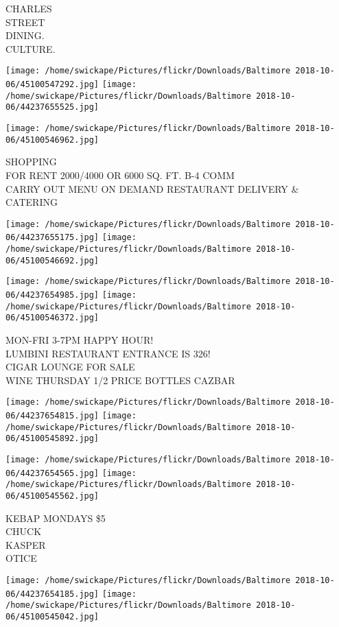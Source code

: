 \documentclass[10pt,letterpaper]{article}
\begin{document}
CHARLES\\
STREET\\
DINING.\\
CULTURE.
\pagebreak

\texttt{[image: /home/swickape/Pictures/flickr/Downloads/Baltimore 2018-10-06/45100547292.jpg]}
\texttt{[image: /home/swickape/Pictures/flickr/Downloads/Baltimore 2018-10-06/44237655525.jpg]}

\vspace{0.25in}
\texttt{[image: /home/swickape/Pictures/flickr/Downloads/Baltimore 2018-10-06/45100546962.jpg]}

SHOPPING\\
FOR RENT 2000/4000 OR 6000 SQ. FT. B{-}4 COMM\\
CARRY OUT MENU ON DEMAND RESTAURANT DELIVERY \& CATERING
\pagebreak

\texttt{[image: /home/swickape/Pictures/flickr/Downloads/Baltimore 2018-10-06/44237655175.jpg]}
\texttt{[image: /home/swickape/Pictures/flickr/Downloads/Baltimore 2018-10-06/45100546692.jpg]}

\texttt{[image: /home/swickape/Pictures/flickr/Downloads/Baltimore 2018-10-06/44237654985.jpg]}
\texttt{[image: /home/swickape/Pictures/flickr/Downloads/Baltimore 2018-10-06/45100546372.jpg]}

MON{-}FRI 3{-}7PM HAPPY HOUR!\\
LUMBINI RESTAURANT ENTRANCE IS 326!\\
CIGAR LOUNGE FOR SALE\\
WINE THURSDAY 1/2 PRICE BOTTLES CAZBAR
\pagebreak

\texttt{[image: /home/swickape/Pictures/flickr/Downloads/Baltimore 2018-10-06/44237654815.jpg]}
\texttt{[image: /home/swickape/Pictures/flickr/Downloads/Baltimore 2018-10-06/45100545892.jpg]}

\texttt{[image: /home/swickape/Pictures/flickr/Downloads/Baltimore 2018-10-06/44237654565.jpg]}
\texttt{[image: /home/swickape/Pictures/flickr/Downloads/Baltimore 2018-10-06/45100545562.jpg]}

KEBAP MONDAYS \$5\\
CHUCK\\
KASPER\\
OTICE
\pagebreak

\texttt{[image: /home/swickape/Pictures/flickr/Downloads/Baltimore 2018-10-06/44237654185.jpg]}
\texttt{[image: /home/swickape/Pictures/flickr/Downloads/Baltimore 2018-10-06/45100545042.jpg]}
\end{document}
